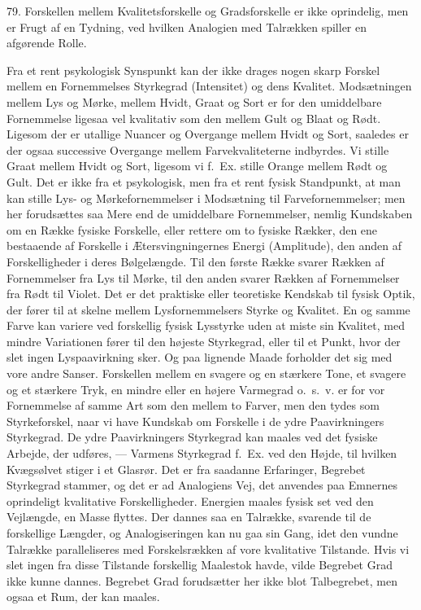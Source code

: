\documentclass[12pt,a4paper]{book}
\newcommand{\apage}[1]{\marginnote{\footnotesize\textit{[#1]}}}
\begin{document}
79. Forskellen mellem Kvalitetsforskelle og Gradsforskelle er ikke
oprindelig, men er Frugt af en Tydning, ved hvilken Analogien med
Talrækken spiller en afgørende Rolle.

\apage{194} Fra et rent psykologisk Synspunkt kan der ikke drages nogen skarp
Forskel mellem en Fornemmelses Styrkegrad (Intensitet) og dens Kvalitet.
Modsætningen mellem Lys og Mørke, mellem Hvidt, Graat og Sort er for den
umiddelbare Fornemmelse ligesaa vel kvalitativ som den mellem Gult og
Blaat og Rødt. Ligesom der er utallige Nuancer og Overgange mellem Hvidt
og Sort, saaledes er der ogsaa successive Overgange mellem
Farvekvaliteterne indbyrdes. Vi stille Graat mellem Hvidt og Sort,
ligesom vi f.\ Ex. stille Orange mellem Rødt og Gult. Det er ikke fra et
psykologisk, men fra et rent fysisk Standpunkt, at man kan stille Lys-
og Mørkefornemmelser i Modsætning til Farvefornemmelser; men her
forudsættes saa Mere end de umiddelbare Fornemmelser, nemlig Kundskaben
om en Række fysiske Forskelle, eller rettere om to fysiske Rækker, den
ene bestaaende af Forskelle i Ætersvingningernes Energi (Amplitude), den
anden af Forskelligheder i deres Bølgelængde. Til den første Række
svarer Rækken af Fornemmelser fra Lys til Mørke, til den anden svarer
Rækken af Fornemmelser fra Rødt til Violet. Det er det praktiske eller
teoretiske Kendskab til fysisk Optik, der fører til at skelne mellem
Lysfornemmelsers Styrke og Kvalitet. En og samme Farve kan variere ved
forskellig fysisk Lysstyrke uden at miste sin Kvalitet, med mindre
Variationen fører til den højeste Styrkegrad, eller til et Punkt, hvor
der slet ingen Lyspaavirkning sker. Og paa lignende Maade forholder det
sig med vore andre Sanser. Forskellen mellem en svagere og en stærkere
Tone, et svagere og et stærkere Tryk, en mindre eller en højere
Varmegrad o.\ s.\ v. er for vor Fornemmelse af samme Art som den mellem
to Farver, men den tydes som Styrkeforskel, naar vi have Kundskab om
Forskelle i de ydre Paavirkningers Styrkegrad. De ydre Paavirkningers
Styrkegrad kan maales ved det fysiske Arbejde, der udføres, --- Varmens
Styrkegrad f.\ Ex. ved den Højde, til hvilken Kvægsølvet stiger i et
Glasrør. Det er fra saadanne Erfaringer, Begrebet Styrkegrad stammer, og
det er ad Analogiens Vej, det anvendes paa Emnernes oprindeligt
kvalitative Forskelligheder. Energien \apage{195} maales fysisk set ved den
Vejlængde, en Masse flyttes. Der dannes saa en Talrække, svarende til de
forskellige Længder, og Analogiseringen kan nu gaa sin Gang, idet den
vundne Talrække paralleliseres med Forskelsrækken af vore kvalitative
Tilstande. Hvis vi slet ingen fra disse Tilstande forskellig Maalestok
havde, vilde Begrebet Grad ikke kunne dannes. Begrebet Grad forudsætter
her ikke blot Talbegrebet, men ogsaa et Rum, der kan maales.
\end{document}
